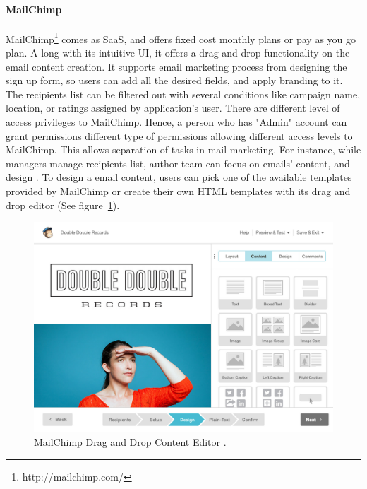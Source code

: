 \paragraph{MailChimp}
MailChimp\footnote{http://mailchimp.com/} comes as \ac{SaaS}, and offers fixed cost monthly plans or pay as you go plan. A long with its intuitive \ac{UI}, it offers a drag and drop functionality on the email content creation. It supports email marketing process from designing the sign up form, so users can add all the desired fields, and apply branding to it. The recipients list can be filtered out with several conditions like campaign name, location, or ratings assigned by application's user. There are different level of access privileges to MailChimp. Hence, a person who has "Admin" account can grant permissions different type of permissions allowing different access levels to MailChimp. This allows separation of tasks in mail marketing. For instance, while managers manage recipients list, author team can focus on emails' content, and design \citep{TheRocketScienceGroupLLC2013}. To design a email content, users can pick one of the available templates provided by MailChimp or create their own \ac{HTML} templates with its drag and drop editor (See figure~\ref{fig:MailChimp-DragAndDropEditor}).
\vspace{1cm}

\begin{figure}[htbp]
	\includegraphics[width=1.00\textwidth]{imgs/MailChimp-DragAndDropEditor.jpg}
	\caption[MailChimp Drag and Drop Content Editor]{MailChimp Drag and Drop Content Editor \citep{TheRocketScienceGroupLLC2013a}.}
	\label{fig:MailChimp-DragAndDropEditor}
\end{figure}

